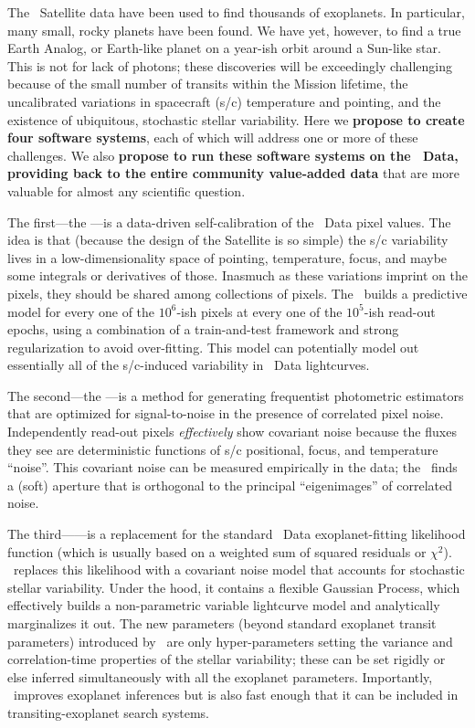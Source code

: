 \documentclass[letterpaper,12pt]{article}
\begin{document}
The \Kepler\ Satellite data have been used to find thousands of exoplanets.
In particular, many small, rocky planets have been found.
We have yet, however, to find a true Earth Analog, or Earth-like planet on a
year-ish orbit around a Sun-like star.
This is not for lack of photons;
these discoveries will be exceedingly challenging
because of the small number of transits within the Mission lifetime,
the uncalibrated variations in spacecraft (s/c) temperature and pointing,
and the existence of ubiquitous, stochastic stellar variability.
Here we \textbf{propose to create four software systems}, each of which will
address one or more of these challenges.
We also \textbf{propose to run these software systems on the \Kepler\ Data,
providing back to the entire community value-added data} that are more valuable
for almost any scientific question.

The first---the \PLM---is a data-driven self-calibration of the
\Kepler\ Data pixel values.  
The idea is that (because the design of the Satellite is so simple)
the s/c variability lives in a low-dimensionality space of pointing,
temperature, focus, and maybe some integrals or derivatives of those.
Inasmuch as these variations imprint on the pixels, they should be shared among
collections of pixels.
The \PLM\ builds a predictive model for every one of the $10^6$-ish pixels at
every one of the $10^5$-ish read-out epochs, using a combination of a
train-and-test framework and strong regularization to avoid over-fitting.
This model can potentially model out essentially all of the s/c-induced
variability in \Kepler\ Data lightcurves.

The second---the \OWL---is a method for generating frequentist
photometric estimators that are optimized for signal-to-noise in the presence
of correlated pixel noise.
Independently read-out pixels \emph{effectively} show
covariant noise because the fluxes they see are deterministic functions
of s/c positional, focus, and temperature ``noise''.
This covariant noise can be measured empirically in the data; the \OWL\ finds a
(soft) aperture that is orthogonal to the principal ``eigenimages''
of correlated noise.

The third---\George---is a replacement for the standard \Kepler\ Data
exoplanet-fitting likelihood function (which is usually based on a weighted sum
of squared residuals or $\chi^2$).
\George\ replaces this likelihood with a covariant noise model that accounts for
stochastic stellar variability.
Under the hood, it contains a flexible Gaussian Process, which effectively
builds a non-parametric variable lightcurve model and analytically marginalizes
it out.
The new parameters (beyond standard exoplanet transit parameters) introduced
by \George\ are only hyper-parameters setting the variance and correlation-time
properties of the stellar variability; these can be set rigidly or else inferred
simultaneously with all the exoplanet parameters.
Importantly, \George\ improves exoplanet inferences but is also fast enough that
it can be included in transiting-exoplanet search systems.
\end{document}
